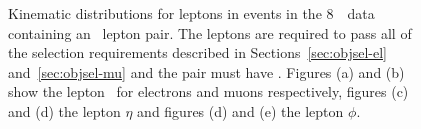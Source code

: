 \begin{figure}[h]
{        }
    \caption[Lepton kinematic distributions for \dilep\ events in the 8~\tev\
    data. ]
    {\small Kinematic distributions for leptons in events in the 8~\tev\
    data containing an \ossf\ lepton pair. The leptons are required to pass all of the selection
    requirements described in Sections~\ref{sec:objsel-el}
    and~\ref{sec:objsel-mu} and the pair must have \sstooos. 
    Figures (a) and (b) show the lepton \pt\ for electrons and muons
    respectively, figures (c) and (d) the lepton $\eta$ and figures (d) and (e)
    the lepton $\phi$.    }
\label{fig:dilep-lepkin-eight}
\end{figure}

